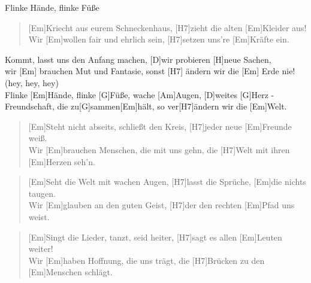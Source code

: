 \begin{song}{Flinke H\"ande, flinke F\"u\ss{}e}{}

    \begin{verse}  
        [Em]Kriecht aus eurem Schneckenhaus, [H7]zieht die alten [Em]Kleider aus! \\
        Wir [Em]wollen fair und ehrlich sein, [H7]setzen uns're [Em]Kr\"afte ein.
    \end{verse}  

    \begin{chorus}
        [G]Kommt, lasst uns den Anfang machen, [D]wir probieren [H]neue Sachen, \\
        wir [Em] brauchen Mut und Fantasie, sonst [H7] \"andern wir die [Em] Erde nie! (hey, hey, hey) \\
        Flinke [Em]H\"ande, flinke [G]F\"u\ss{}e, wache [Am]Augen, [D]weites [G]Herz - \\
        [C]Freundschaft, die zu[G]sammen[Em]h\"alt, so ver[H7]{}\"andern wir die [Em]Welt.
    \end{chorus}

    \begin{verse}  
        [Em]Steht nicht abseits, schlie\ss{}t den Kreis, [H7]jeder neue [Em]Freunde wei\ss{}. \\
        Wir [Em]brauchen Menschen, die mit uns gehn, die [H7]Welt mit ihren [Em]Herzen seh'n.
    \end{verse}  


    \begin{verse}  
        [Em]Seht die Welt mit wachen Augen, [H7]lasst die Spr\"uche, [Em]die nichts taugen. \\
        Wir [Em]glauben an den guten Geist, [H7]der den rechten [Em]Pfad uns weist.
    \end{verse}  


    \begin{verse}  
        [Em]Singt die Lieder, tanzt, seid heiter, [H7]sagt es allen [Em]Leuten weiter!\\
        Wir [Em]haben Hoffnung, die uns tr\"agt, die [H7]Br\"ucken zu den [Em]Menschen schl\"agt.
    \end{verse}  


\end{song}

